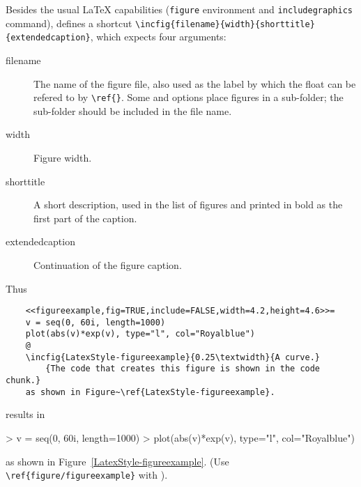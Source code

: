 \documentclass{article}
\begin{document}
Besides the usual \LaTeX{} capabilities (\verb+figure+ environment and
\verb+includegraphics+ command),  defines a
shortcut \verb+\incfig{filename}{width}{shorttitle}{extendedcaption}+,
which expects four arguments:
\begin{description}
\item[filename] The name of the figure file, also used as the label by
  which the float can be refered to by \verb+\ref{}+. Some
   and  options place figures in a
  sub-folder; the sub-folder should be included in the file name.
\item[width] Figure width.
\item[shorttitle] A short description, used in the list of figures and
  printed in bold as the first part of the caption.
\item[extendedcaption] Continuation of the figure caption.
\end{description}
Thus
\begin{verbatim}
    <<figureexample,fig=TRUE,include=FALSE,width=4.2,height=4.6>>=
    v = seq(0, 60i, length=1000)
    plot(abs(v)*exp(v), type="l", col="Royalblue")
    @ 
    \incfig{LatexStyle-figureexample}{0.25\textwidth}{A curve.}
        {The code that creates this figure is shown in the code chunk.}
    as shown in Figure~\ref{LatexStyle-figureexample}.
\end{verbatim}
results in 
\begin{Schunk}
\begin{Sinput}
> v = seq(0, 60i, length=1000)
> plot(abs(v)*exp(v), type="l", col="Royalblue")
\end{Sinput}
\end{Schunk}
  as shown in
Figure~\ref{LatexStyle-figureexample}. (Use
\verb+\ref{figure/figureexample}+ with ).

\end{document}

